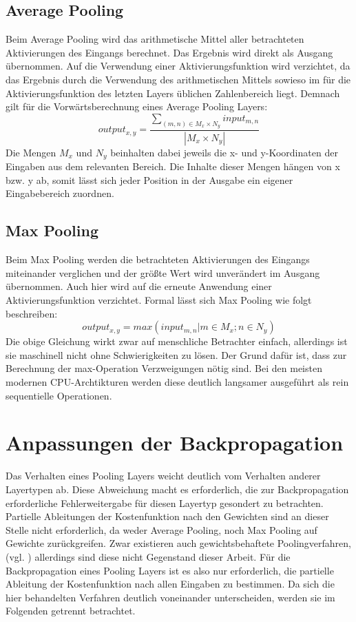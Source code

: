 \documentclass[../main.tex]{subfiles}
\begin{document}
\subsection{Average Pooling}
Beim Average Pooling wird das arithmetische Mittel aller betrachteten Aktivierungen des Eingangs berechnet. Das Ergebnis wird direkt als Ausgang übernommen. Auf die Verwendung einer Aktivierungsfunktion wird verzichtet, da das Ergebnis durch die Verwendung des arithmetischen Mittels sowieso im für die Aktivierungsfunktion des letzten Layers üblichen Zahlenbereich liegt. Demnach gilt für die Vorwärtsberechnung eines Average Pooling Layers: 
\begin{equation} \label{eq:averagepooling}
output_{x, y} = \frac{\sum\limits_{(m, n)\in{M_x}\times{N_y}} input_{m, n}}{|M_x\times{N_y}|}
\end{equation}
Die Mengen \(M_x\) und \(N_y\) beinhalten dabei jeweils die x- und y-Koordinaten der Eingaben aus dem relevanten Bereich. Die Inhalte dieser Mengen hängen von x bzw. y ab, somit lässt sich jeder Position in der Ausgabe ein eigener Eingabebereich zuordnen. 
\subsection{Max Pooling} \label{maxpool_forward}
Beim Max Pooling werden die betrachteten Aktivierungen des Eingangs miteinander verglichen und der größte Wert wird unverändert im Ausgang übernommen. Auch hier wird auf die erneute Anwendung einer Aktivierungsfunktion verzichtet. Formal lässt sich Max Pooling wie folgt beschreiben: 
\begin{equation} \label{eq:maxpooling}
output_{x, y} = max( {input_{m,n} | m \in M_x; n \in N_y})
\end{equation}
Die obige Gleichung wirkt zwar auf menschliche Betrachter einfach, allerdings ist sie maschinell nicht ohne Schwierigkeiten zu lösen. Der Grund dafür ist, dass zur Berechnung der max-Operation Verzweigungen nötig sind. Bei den meisten modernen CPU-Archtikturen werden diese deutlich langsamer ausgeführt als rein sequentielle Operationen. 
\section{Anpassungen der Backpropagation}
Das Verhalten eines Pooling Layers weicht deutlich vom Verhalten anderer Layertypen ab. Diese Abweichung macht es erforderlich, die zur Backpropagation erforderliche Fehlerweitergabe für diesen Layertyp gesondert zu betrachten. Partielle Ableitungen der Kostenfunktion nach den Gewichten sind an dieser Stelle nicht erforderlich, da weder Average Pooling, noch Max Pooling auf Gewichte zurückgreifen. Zwar existieren auch gewichtsbehaftete Poolingverfahren, (vgl. \cite{paperMixedPooling}) allerdings sind diese nicht Gegenstand dieser Arbeit. Für die Backpropagation eines Pooling Layers ist es also nur erforderlich, die partielle Ableitung der Kostenfunktion nach allen Eingaben zu bestimmen. Da sich die hier behandelten Verfahren deutlich voneinander unterscheiden, werden sie im Folgenden getrennt betrachtet. 
\end{document}
